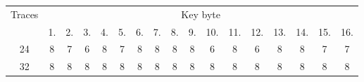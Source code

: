 \begin{tabular}{| c | c | c | c | c | c | c | c | c | c | c | c | c | c | c | c | c |}
	\hline
	\multirow{2}{*}{Traces} & \multicolumn{16}{c|}{Key byte} \\
	\cline{2-17}
	~  &  1. &  2. &  3. &  4. &  5. &  6. &  7. &  8.  &  9. & 10. & 11. & 12. & 13. & 14. & 15. & 16. \\
	\hline
	24 & 8 & 7 & 6 & 8 & 7 & 8 & 8 & 8 & 8 & 6 & 8 & 6 & 8 & 8 & 7 & 7 \\
	\hline
	32 & 8 & 8 & 8 & 8 & 8 & 8 & 8 & 8 & 8 & 8 & 8 & 8 & 8 & 8 & 8 & 8 \\
	\hline
\end{tabular}
